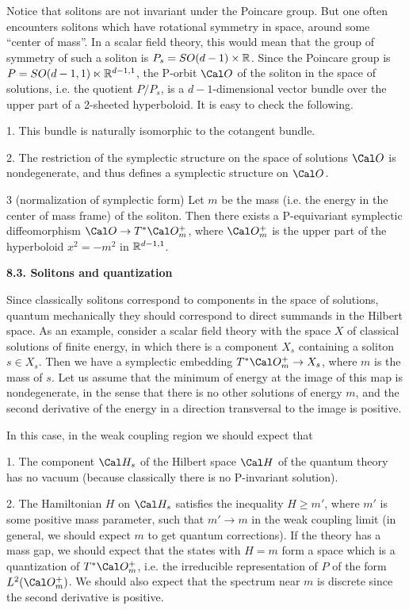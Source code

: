 Notice that solitons are not invariant under the Poincare group. But 
one often encounters
 solitons which have rotational symmetry in space, around some
``center of mass''. In a scalar field theory, this would mean that 
the group of symmetry of such a soliton is $P_s=SO(d-1)\times \Bbb R$. 
Since the Poincare group is $P=SO(d-1,1)\ltimes \Bbb R^{d-1,1}$, the 
P-orbit $\O$ of the soliton in the space of solutions, i.e. the quotient
$P/P_s$, is a $d-1$-dimensional vector bundle over the upper part 
of a 2-sheeted hyperboloid. It is easy to check the following.

1. This bundle is naturally isomorphic to the cotangent bundle. 

2. The restriction of the symplectic structure on the space of solutions 
$\O$ is nondegenerate, and thus defines a symplectic structure on $\O$. 

3 (normalization of symplectic form) Let $m$ be the mass 
(i.e. the energy in the center of mass frame) of the 
soliton. Then there exists a P-equivariant symplectic diffeomorphism 
$\O\to T^*\O_m^+$, where $\O_m^+$ is the 
upper part of the hyperboloid $x^2=-m^2$ in $\Bbb R^{d-1,1}$.
    
{\bf 8.3. Solitons and quantization}

Since classically solitons correspond to components in the space of 
solutions, quantum mechanically they should correspond to 
direct summands in the Hilbert space. As an example, consider a scalar 
field theory with the space $X$ of classical solutions of finite energy,
in which there is a component $X_s$ containing a soliton $s\in X_s$. 
Then we have a symplectic embedding $T^*\O_m^+\to X_s$, where 
$m$ is the mass of $s$. Let us assume that the minimum of energy 
at the image of this map is nondegenerate, in the sense that there is no other 
solutions of energy $m$, and the second derivative of the energy in a 
direction  transversal to the image is positive. 

In this case, in the weak coupling region we should expect that 

1. The component $\Cal H_s$ of the Hilbert space $\Cal H$ of the quantum 
theory has no vacuum (because classically there is no P-invariant solution).

2. The Hamiltonian $H$ on $\Cal H_s$ satisfies the inequality $H\ge m'$,
where $m'$ is some positive mass parameter, such that $m'\to m$ in the weak 
coupling limit (in general, we should expect $m$ to get quantum corrections).
If the theory has a mass gap, we should expect that     
the states with $H=m$ form a space which is a quantization of $T^*\O_m^+$, 
i.e. the irreducible representation of $P$ of the form $L^2(\O_m^+)$. 
We should also expect that the spectrum near $m$ is discrete since the second 
derivative is positive. 

